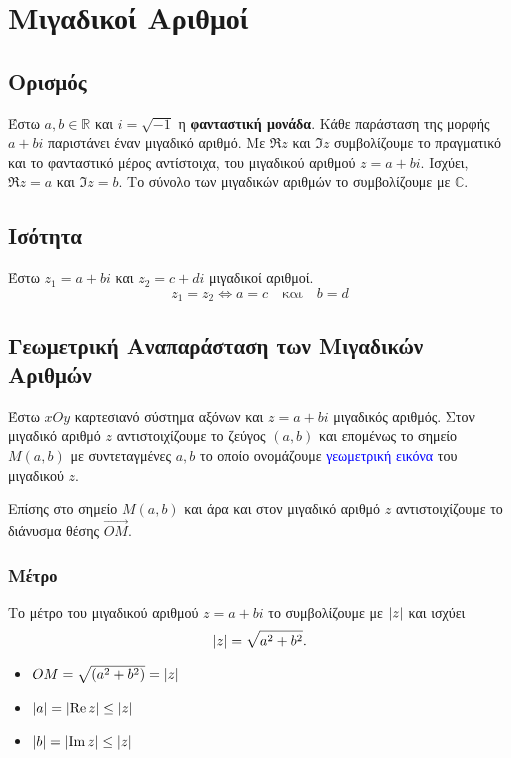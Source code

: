 \section{Μιγαδικοί Αριθμοί}

\subsection*{Ορισμός}

  Έστω $a,b \in \mathbb{R}$ και $i=\sqrt{-1}$ η
  \textbf{φανταστική μονάδα}. Κάθε
  παράσταση της μορφής $a+bi$ παριστάνει έναν {\color{blue} μιγαδικό αριθμό}.
  Με  $\Re z$ και $\Im z$ συμβολίζουμε το {\color{blue} πραγματικό} και το
  {\color{blue} φανταστικό} μέρος αντίστοιχα, του μιγαδικού αριθμού $z=a+bi$.
  Ισχύει,  $\Re z=a$ και $\Im z=b$.
  Το σύνολο των μιγαδικών αριθμών το συμβολίζουμε με $\mathbb{C}$.


  \subsection*{Ισότητα}

   Έστω $z_{1}=a+bi$ και $z_{2}=c+di$ μιγαδικοί αριθμοί.
  \[
    z_{1}=z_{2}\Leftrightarrow a=c \quad \text{και} \quad b=d
  \]


  \subsection*{Γεωμετρική Αναπαράσταση των Μιγαδικών Αριθμών}

  Έστω $xOy$ καρτεσιανό σύστημα αξόνων και $z=a+bi$ μιγαδικός αριθμός. Στον μιγαδικό αριθμό $z$  αντιστοιχίζουμε το ζεύγος $(a,b)$ και επομένως το σημείο $M(a,b)$ με συντεταγμένες $a,b$ το οποίο ονομάζουμε \textcolor{blue}{γεωμετρική εικόνα} του μιγαδικού $z$.

  Επίσης στο σημείο $M(a,b)$ και άρα και στον μιγαδικό αριθμό $z$ αντιστοιχίζουμε το διάνυσμα θέσης $\vec{OM}$.

  \subsubsection*{Μέτρο}

  Το {\color{blue} μέτρο} του μιγαδικού αριθμού $z=a+bi$ το
  συμβολίζουμε με $\abs{z}$ και ισχύει
\[
  \abs{z}=\sqrt{a^2+b^2}.
\]

  \begin{itemize}
    \item   $OM=\sqrt{(a^{2}+b^{2})}=\abs{z}$
    \item   $\abs{a}=\abs{\Re z}\leq \abs{z}$
    \item   $\abs{b}=\abs{\Im z}\leq \abs{z}$
  \end{itemize}

